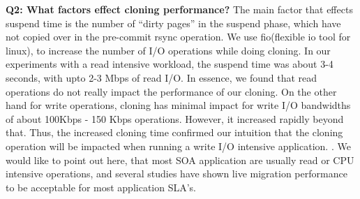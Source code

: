\fi

\noindent \textbf{ Q2: What factors effect cloning performance? }
The main factor that effects suspend time is the number of ``dirty pages'' in the suspend phase, which have not copied over in the pre-commit rsync operation.
We use fio(flexible io tool for linux)\cite{fio}, to increase the number of I/O operations while doing cloning. 
In our experiments with a read intensive workload, the suspend time was about 3-4 seconds, with upto 2-3 Mbps of read I/O. 
In essence, we found that read operations do not really impact the performance of our cloning. 
On the other hand for write operations, cloning has minimal impact for write I/O bandwidths of about 100Kbps - 150 Kbps operations. 
However, it increased rapidly beyond that. Thus, the increased cloning time confirmed our intuition that the cloning operation will be impacted when running a write I/O intensive application.
.
We would like to point out here, that most SOA application are usually read or CPU intensive operations, and several studies have shown live migration performance to be acceptable\cite{vmperformance} for most application SLA's. 

